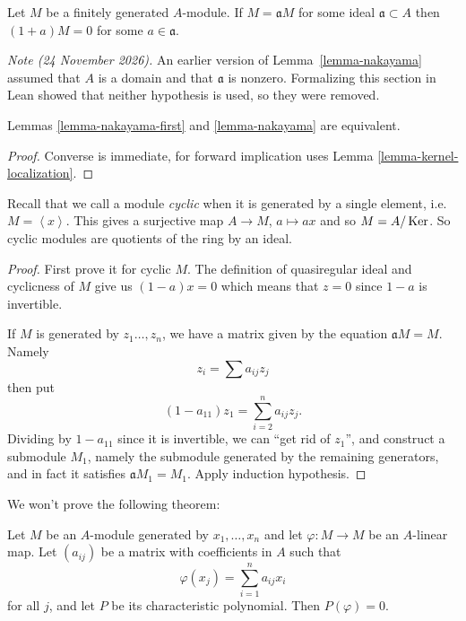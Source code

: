 \begin{lemma}[Nakayama]
\label{lemma-nakayama}
Let $M$ be
a finitely generated $A$-module.
If $M = \mathfrak{a}M$ for some ideal
$\mathfrak{a}\subset A$
then $(1+a)M=0$
for some $a \in \mathfrak{a}$.
\end{lemma}

\medskip\noindent
{\it Note (24 November 2026).}
An earlier version of
Lemma~\ref{lemma-nakayama} assumed that
$A$ is a domain and that $\mathfrak{a}$
is nonzero. Formalizing this section in Lean
showed that neither hypothesis is used,
so they were removed.

\begin{lemma}
\label{lemma-nakayama-equivalence}
Lemmas \ref{lemma-nakayama-first}
and \ref{lemma-nakayama} are equivalent.
\end{lemma}

\begin{proof}
Converse is immediate,
for forward implication uses
Lemma \ref{lemma-kernel-localization}.
\end{proof}

\noindent
Recall that we call a module
{\it cyclic} when it is generated by
a single element, i.e.
$M=\left\langle{}x\right\rangle{}$.
This gives a surjective map
$A \to M$, $a \mapsto ax$
and so $M=A/\mathop{\mathrm{Ker}}$.
So cyclic modules are quotients of
the ring by an ideal.

\begin{proof}
First prove it for cyclic $M$.
The definition of quasiregular ideal and
cyclicness of $M$ give us
$(1-a)x=0$ which means that $z=0$
since $1-a$ is invertible.

If $M$ is generated by $z_1…,z_n$,
we have a matrix given by the equation
$\mathfrak{a}M=M$.
Namely
$$
z_i=\sum a_{ij}z_j
$$
then put
$$
(1-a_{11})z_1=\sum_{i=2}^na_{ij}z_j.
$$
Dividing by $1-a_{11}$ since it is
invertible, we can ``get rid of $z_1$'',
and construct a submodule $M_1$, namely
the submodule generated by the remaining
generators, and in fact it satisfies
$\mathfrak{a}M_1=M_1$. Apply induction
hypothesis.

\end{proof}

\noindent
We won't prove the following theorem:

\begin{theorem}
\label{theorem-cayley-hamilton}
Let $M$ be an $A$-module generated by
$x_1,\ldots,x_n$ and let
$\varphi:M \to M$ be an $A$-linear map.
Let $(a_{ij})$ be a matrix with
coefficients in $A$ such that
$$
\varphi(x_j)=\sum_{i=1}^n a_{ij}x_i
$$
for all $j$, and let $P$ be its
characteristic polynomial.
Then $P(\varphi)=0$.
\end{theorem}

